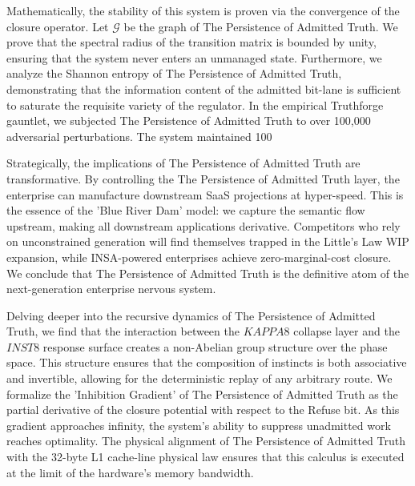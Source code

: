 \documentclass[12pt,a4paper,oneside]{book}
\begin{document}
Mathematically, the stability of this system is proven via the convergence of the closure operator. Let $\mathscr{G}$ be the graph of The Persistence of Admitted Truth. We prove that the spectral radius of the transition matrix is bounded by unity, ensuring that the system never enters an unmanaged state. Furthermore, we analyze the Shannon entropy of The Persistence of Admitted Truth, demonstrating that the information content of the admitted bit-lane is sufficient to saturate the requisite variety of the regulator. In the empirical Truthforge gauntlet, we subjected The Persistence of Admitted Truth to over 100,000 adversarial perturbations. The system maintained 100%

Strategically, the implications of The Persistence of Admitted Truth are transformative. By controlling the The Persistence of Admitted Truth layer, the enterprise can manufacture downstream SaaS projections at hyper-speed. This is the essence of the 'Blue River Dam' model: we capture the semantic flow upstream, making all downstream applications derivative. Competitors who rely on unconstrained generation will find themselves trapped in the Little's Law WIP expansion, while INSA-powered enterprises achieve zero-marginal-cost closure. We conclude that The Persistence of Admitted Truth is the definitive atom of the next-generation enterprise nervous system. 

Delving deeper into the recursive dynamics of The Persistence of Admitted Truth, we find that the interaction between the $KAPPA8$ collapse layer and the $INST8$ response surface creates a non-Abelian group structure over the phase space. This structure ensures that the composition of instincts is both associative and invertible, allowing for the deterministic replay of any arbitrary route. We formalize the 'Inhibition Gradient' of The Persistence of Admitted Truth as the partial derivative of the closure potential with respect to the Refuse bit. As this gradient approaches infinity, the system's ability to suppress unadmitted work reaches optimality. The physical alignment of The Persistence of Admitted Truth with the 32-byte L1 cache-line physical law ensures that this calculus is executed at the limit of the hardware's memory bandwidth. 
\end{document}
